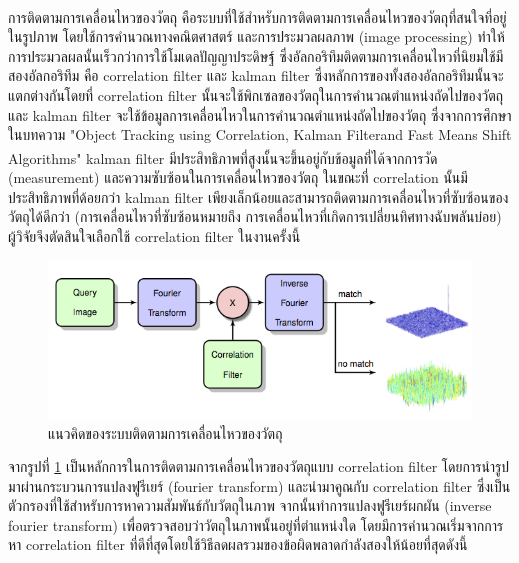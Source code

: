 การติดตามการเคลื่อนไหวของวัตถุ\textsuperscript{\cite{danelljan2014accurate}} คือระบบที่ใช้สำหรับการติดตามการเคลื่อนไหวของวัตถุที่สนใจที่อยู่ในรูปภาพ 
โดยใช้การคำนวณทางคณิตศาสตร์ และการประมวลผลภาพ (image processing) ทำให้การประมวลผลนั้นเร็วกว่าการใช้โมเดลปัญญาประดิษฐ์ ซึ่งอัลกอริทึมติดตามการเคลื่อนไหวที่นิยมใช้มีสองอัลกอริทึม
คือ correlation filter และ kalman filter ซึ่งหลักการของทั้งสองอัลกอริทึมนั้นจะแตกต่างกันโดยที่ correlation filter นั้นจะใช้พิกเซลของวัตถุในการคำนวณตำแหน่งถัดไปของวัตถุ 
และ kalman filter จะใช้ข้อมูลการเคลื่อนไหวในการคำนวณตำแหน่งถัดไปของวัตถุ ซึ่งจากการศึกษาในบทความ "Object Tracking using Correlation,
Kalman Filterand Fast Means Shift Algorithms"\textsuperscript{\cite{ali2006object}} kalman filter มีประสิทธิภาพที่สูงนั้นจะขึ้นอยู่กับข้อมูลที่ได้จากการวัด (measurement)
และความซับซ้อนในการเคลื่อนไหวของวัตถุ ในขณะที่ correlation นั้นมีประสิทธิภาพที่ด้อยกว่า kalman filter เพียงเล็กน้อยและสามารถติดตามการเคลื่อนไหวที่ซับซ้อนของวัตถุได้ดีกว่า 
(การเคลื่อนไหวที่ซับซ้อนหมายถึง การเคลื่อนไหวที่เกิดการเปลี่ยนทิศทางฉับพลันบ่อย) ผู้วิจัยจึงตัดสินใจเลือกใช้ correlation filter ในงานครั้งนี้
\begin{figure}[!ht]
	\centering
	\includegraphics[width=1\textwidth]{chapter2/images/track-concept.png}
		\caption{แนวคิดของระบบติดตามการเคลื่อนไหวของวัตถุ}
    	\label{fig:Track_concept}
\end{figure}

จากรูปที่ \ref{fig:Track_concept} เป็นหลักการในการติดตามการเคลื่อนไหวของวัตถุแบบ correlation filter โดยการนำรูปมาผ่านกระบวนการแปลงฟูรีเยร์ (fourier transform)
และนำมาคูณกับ correlation filter ซึ่งเป็นตัวกรองที่ใช้สำหรับการหาความสัมพันธ์กับวัตถุในภาพ จากนั้นทำการแปลงฟูรีเยร์ผกผัน (inverse fourier transform) 
เพื่อตรวจสอบว่าวัตถุในภาพนั้นอยู่ที่ตำแหน่งใด โดยมีการคำนวณเริ่มจากการหา correlation filter ที่ดีที่สุดโดยใช้วิธีลดผลรวมของข้อผิดพลาดกำลังสองให้น้อยที่สุดดังนี้

